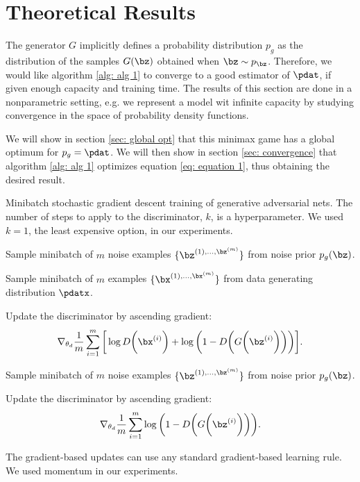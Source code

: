 \section{Theoretical Results}

The generator $G$ implicitly defines a probability distribution $p_g$ as the distribution of the samples $G(\bz)$ obtained when $\bz\sim p_{\bz}$. Therefore, we would like algorithm \ref{alg: alg 1} to converge to a good estimator of  $\pdat$, if given enough capacity and training time. The results of this section are done in a nonparametric setting, e.g. we represent a model wit infinite capacity by studying convergence in the space of probability density functions.

\noindent We will show in section \ref{sec: global opt} that this minimax game has a global optimum for $p_g = \pdat$. We will then show in section \ref{sec: convergence} that algorithm \ref{alg: alg 1} optimizes equation \ref{eq: equation 1}, thus obtaining the desired result.

\begin{algorithm}
    \caption{Minibatch stochastic gradient descent training of generative adversarial nets. The number of steps to apply to the discriminator, $k$, is a hyperparameter. We used $k = 1$, the least expensive option, in our experiments.}
    \label{alg: alg 1}
    \begin{algorithmic}

            \textbullet \parbox[t]{0.9\linewidth}{Sample minibatch of $m$ noise examples $\{\bz^{(1), \dots, \bz^{(m)}}\}$ from noise prior $p_g(\bz)$.}

			\textbullet \parbox[t]{0.9\linewidth}{Sample minibatch of $m$ examples $\{\bx^{(1), \dots, \bx^{(m)}}\}$ from data generating distribution $\pdatx$.}

			\textbullet Update the discriminator by ascending gradient:
			\begin{equation*}
				\nabla_{\theta_d}\frac{1}{m}\sum^m_{i=1}{\bigg[\log D\bigg(\bx^{(i)}\bigg)+\log\bigg(1-D\bigg(G\bigg(\bz^{(i)}\bigg)\bigg)\bigg)\bigg]}.
			\end{equation*}
        \EndFor

		\textbullet \parbox[t]{0.9\linewidth}{Sample minibatch of $m$ noise examples $\{\bz^{(1), \dots, \bz^{(m)}}\}$ from noise prior $p_g(\bz)$.}

		\textbullet Update the discriminator by ascending gradient:
			\begin{equation*}
				\nabla_{\theta_d}\frac{1}{m}\sum^m_{i=1}{\log\bigg(1-D\bigg(G\bigg(\bz^{(i)}\bigg)\bigg)\bigg)}.
			\end{equation*}
		\EndFor

		\noindent\parbox[t]{0.9\linewidth}{The gradient-based updates can use any standard gradient-based learning rule. We used momentum in our experiments.}
    \end{algorithmic}
\end{algorithm}

